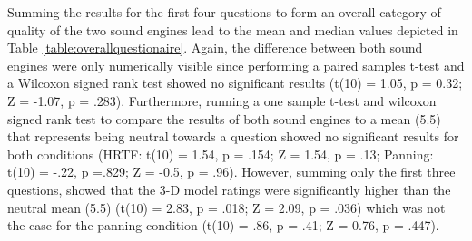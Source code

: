 \documentclass[journal]{IEEEtran}
\begin{document}
Summing the results for the first four questions to form an overall category of quality of the two sound engines lead to the mean and median values depicted in Table \ref{table:overallquestionaire}. Again, the difference between both sound engines were only numerically visible since performing a paired samples t-test and a Wilcoxon signed rank test showed no significant results  (t(10) = 1.05, p = 0.32; Z = -1.07, p = .283). Furthermore, running a one sample t-test and wilcoxon signed rank test to compare the results of both sound engines to a mean (5.5) that represents being neutral towards a question showed no significant results for both conditions (HRTF: t(10) = 1.54, p = .154; Z = 1.54, p = .13; Panning: t(10) = -.22, p =.829; Z = -0.5, p = .96). However, summing only the first three questions, showed that the 3-D model ratings were significantly higher than the neutral mean (5.5) (t(10) = 2.83, p = .018; Z = 2.09, p = .036) which was not the case for the panning condition (t(10) = .86, p = .41; Z = 0.76, p = .447).


%
%

%
%
%
%


\begin{table}[h]
  \caption{Overall results}
\label{table:overallquestionaire}
\end{table}
\end{document}
